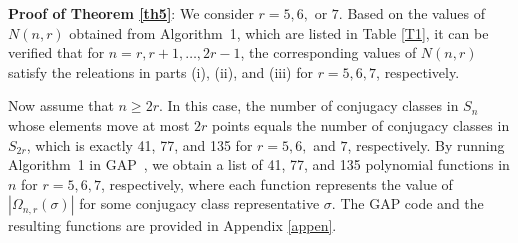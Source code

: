 \documentclass{amsart}
\numberwithin{equation}{section}
\begin{document}
\noindent\textbf{Proof of Theorem \ref{th5}}:
We consider \(r = 5, 6,\) or \(7\). Based on the values of \(N(n,r)\) obtained from Algorithm~1, which are listed in Table \ref{T1}, it can be verified that for \(n = r, r+1, \ldots, 2r - 1\), the corresponding values of \(N(n,r)\) satisfy the releations in parts (i), (ii), and (iii) for \(r = 5, 6, 7\), respectively.

Now assume that \(n \geq 2r\). In this case, the number of conjugacy classes in \(S_n\) whose elements move at most \(2r\) points equals the number of conjugacy classes in \(S_{2r}\), which is exactly 41, 77, and 135 for \(r=5, 6,\) and \(7\), respectively. 
By running Algorithm~1 in \textsf{GAP}~\cite{GAP}, we obtain a list of 41, 77, and 135 polynomial functions in \(n\) for \(r=5,6,7\), respectively, where each function represents the value of \(|\Omega_{n,r}(\sigma)|\) for some conjugacy class representative \(\sigma\). The \textsf{GAP} code and the resulting functions are provided in Appendix \ref{appen}.
\end{document}
